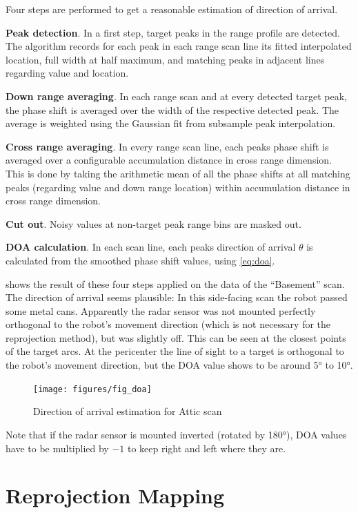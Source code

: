Four steps are performed to get a reasonable estimation of direction of
arrival.

\textbf{Peak detection}. In a first step, target peaks in the
range profile are detected. The algorithm records for each peak in each
range scan line its fitted interpolated location, full width at half
maximum, and matching peaks in adjacent lines regarding value and
location.

\textbf{Down range averaging}. In each range scan and at every
detected target peak, the phase shift is averaged over the width of the
respective detected peak. The average is weighted using the Gaussian fit
from subsample peak interpolation.

\textbf{Cross range averaging}. In
every range scan line, each peaks phase shift is averaged over a
configurable accumulation distance in cross range dimension. This is
done by taking the arithmetic mean of all the phase shifts at all
matching peaks (regarding value and down range location) within
accumulation distance in cross range dimension.

\textbf{Cut out}. Noisy
values at non-target peak range bins are masked out.

\textbf{DOA calculation}. In each scan line, each peaks direction of arrival
\(\theta\) is calculated from the smoothed phase shift values, using \cref{eq:doa}.

 shows the result of these four steps applied on the data of
the ``Basement'' scan. The direction of arrival seems plausible: In this
side-facing scan the robot passed some metal cans. Apparently the radar
sensor was not mounted perfectly orthogonal to the robot's movement
direction (which is not necessary for the reprojection method), but was
slightly off. This can be seen at the closest points of the target
arcs. At the pericenter the line of sight to a target is orthogonal to
the robot's movement direction, but the DOA value shows to be around \ang{5}
to \ang{10}.

\begin{figure}[htbp]
    \centering
    \texttt{[image: figures/fig\_doa]}
    \caption{Direction of arrival estimation for Attic scan}
    \label{fig:fig_doa}
\end{figure}

Note that if the radar sensor is mounted inverted (rotated by \ang{180}), DOA
values have to be multiplied by \(-1\) to keep right and left where they
are.

\section{Reprojection Mapping}\label{reprojection-mapping}

